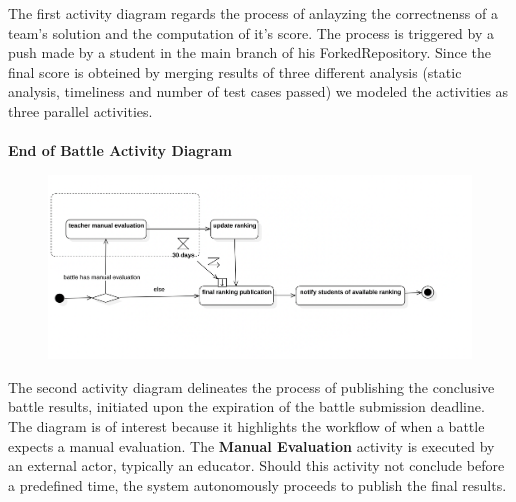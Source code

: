 The first activity diagram regards the process of anlayzing the correctnenss of a team's solution and the computation of it's score. The process is triggered by a push made by a student in the main branch of his ForkedRepository. Since the final score is obteined by merging results of three different analysis (static analysis, timeliness and number of test cases passed) we modeled the activities as three parallel activities.\\
\\
\newpage
\textbf{End of Battle Activity Diagram}\\
\begin{figure}[h]
    \centering
    \includegraphics[width=1\textwidth]{2Overall_Description/res/ActivityDiagramEndBattle.png}
\end{figure}

The second activity diagram delineates the process of publishing the conclusive battle results, initiated upon the expiration of the battle submission deadline. The diagram is of interest because it highlights the workflow of when a battle expects a manual evaluation. The  \textbf{Manual Evaluation} activity is executed by an external actor, typically an educator. Should this activity not conclude before a predefined time, the system autonomously proceeds to publish the final results.
